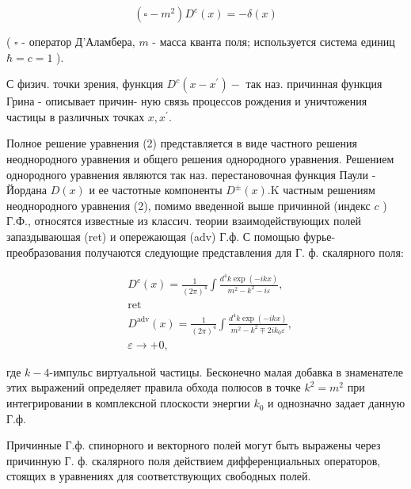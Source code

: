 \documentclass[10pt]{article}
\begin{document}
\[

\left(\square-m^{2}\right) D^{c}(x)=-\delta(x)

\]



( $\square$ - оператор Д'Аламбера, $m$ - масса кванта поля; используется система единиц $\hbar=c=1$ ).



С физич. точки зрения, функция $D^{c}\left(x-x^{\prime}\right)-$ так наз. причинная функция Грина - описывает причин- ную связь процессов рождения и уничтожения частицы в различных точках $x, x^{\prime}$.



Полное решение уравнения (2) представляется в виде частного решения неоднородного уравнения и общего решения однородного уравнения. Решением однородного уравнения являются так наз. перестановочная функция Паули - Йордана $D(x)$ и ее частотные компоненты $D^{ \pm}(x) . \mathrm{K}$ частным решениям неоднородного уравнения (2), помимо введенной выше причинной (индекс $c$ ) Г.Ф., относятся известные из классич. теории взаимодействующих полей запаздываюшая (ret) и опережающая (adv) Г.ф. С помощью фурье-преобразования получаются следующие представления для Г. ф. скалярного поля:



\[

\begin{aligned}

& D^{c}(x)=\frac{1}{(2 \pi)^{4}} \int \frac{d^{4} k \exp (-i k x)}{m^{2}-k^{2}-i \varepsilon}, \\

& \operatorname{ret} \\

& D^{\operatorname{adv}}(x)=\frac{1}{(2 \pi)^{4}} \int \frac{d^{4} k \exp (-i k x)}{m^{2}-k^{2} \mp 2 i k_{0} \varepsilon}, \\

& \varepsilon \rightarrow+0,

\end{aligned}

\]



где $k-4$-импульс виртуальной частицы. Бесконечно малая добавка в знаменателе этих выражений определяет правила обхода полюсов в точке $k^{2}=m^{2}$ при интегрировании в комплексной плоскости энергии $k_{0}$ и однозначно задает данную Г.ф.



Причинные Г.ф. спинорного и векторного полей могут быть выражены через причинную Г. ф. скалярного поля действием дифференциальных операторов, стоящих в уравнениях для соответствующих свободных полей.
\end{document}
